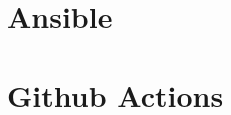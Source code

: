 \documentclass[a4paper]{article}
\begin{document}
    \newpage
    \section{Ansible}
    \subsection{}
    \subsection{}

    \newpage
    \section{Github Actions}
    \subsection{}
    \subsection{}
\end{document}
